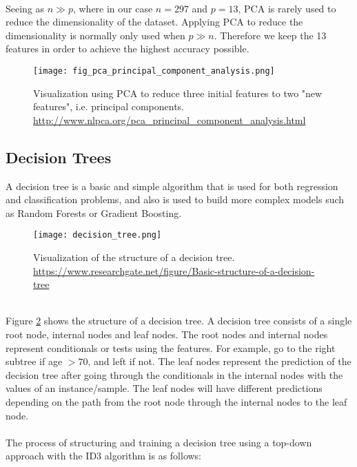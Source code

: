 \documentclass[a4paper,twocolumn]{article}
\begin{document}
\\
Seeing as $n\gg p$, where in our case $n = 297$ and $p = 13$, PCA is rarely used to reduce the dimensionality of the dataset. Applying PCA to reduce the dimensionality is normally only used when $p \gg n$. Therefore we keep the 13 features in order to achieve the highest accuracy possible.
\begin{figure}[ht]
    \centering
    \texttt{[image: fig\_pca\_principal\_component\_analysis.png]}
    \caption{Visualization using PCA to reduce three initial features to two "new features", i.e. principal components. \href{http://www.nlpca.org/pca_principal_component_analysis.html}{http://www.nlpca.org/pca\_principal\_component\_analysis.html}}
    \label{fig:1}
\end{figure}
\subsection{Decision Trees}
A decision tree is a basic and simple algorithm that is used for both regression and classification problems, and also is used to build more complex models such as Random Forests or Gradient Boosting.
\begin{figure}[ht]
    \centering
    \texttt{[image: decision\_tree.png]}
    \caption{Visualization of the structure of a decision tree. \href{https://www.researchgate.net/figure/Basic-structure-of-a-decision-tree-All-decision-trees-are-built-through-recursion_fig3_295860754}{https://www.researchgate.net/figure/Basic-structure-of-a-decision-tree}}
    \label{fig:2}
\end{figure}\\
Figure \ref{fig:2} shows the structure of a decision tree. A decision tree consists of a single root node, internal nodes and leaf nodes. The root nodes and internal nodes represent conditionals or tests using the features. For example, go to the right subtree if age $> 70$, and left if not. The leaf nodes represent the prediction of the decision tree after going through the conditionals in the internal nodes with the values of an instance/sample. The leaf nodes will have different predictions depending on the path from the root node through the internal nodes to the leaf node.\\
\\
The process of structuring and training a decision tree using a top-down approach with the ID3 algorithm is as follows:
\end{document}
